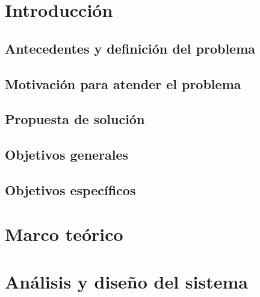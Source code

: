 \documentclass[12pt]{report}
\begin{document}
\newpage

 
\newpage


\newpage
\tableofcontents

\newpage
\listoftables
{} %
\listoffigures
{}
\lstlistoflistings

\chapter{Introducción}


\section{Antecedentes y definición del problema}


\section{Motivación para atender el problema}


\section{Propuesta de solución}


\section{Objetivos generales}


\section{Objetivos específicos}



\chapter{Marco teórico}


\chapter{Análisis y diseño del sistema}


\printbibliography
 
\printglossary

\clearpage

\printglossary[type=\acronymtype]
\end{document}
